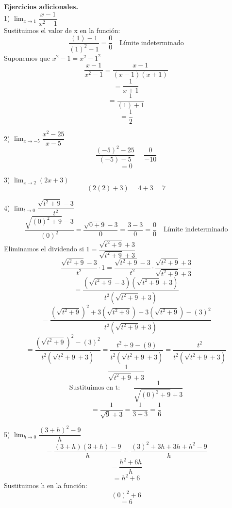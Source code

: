 \documentclass[11pt]{report}
\begin{document}
\pagebreak \textbf{Ejercicios adicionales.}\\[2mm]
1) $\lim_{x \to 1}\dfrac{x-1}{x^2-1}$\\[2mm]
Sustituimos el valor de x en la función:
$$\frac{(1)-1}{(1)^2-1}=\frac{0}{0}\quad \text{Límite indeterminado}$$
Suponemos que $x^2-1=x^2-1^2$
$$\frac{x-1}{x^2-1}=\frac{x-1}{(x-1)(x+1)}$$
$$=\frac{1}{x+1}$$
$$=\frac{1}{(1)+1}$$
$$=\frac{1}{2}$$

2) $\lim_{x \to -5}\dfrac{x^2-25}{x-5}$\\[2mm]
$$\frac{(-5)^2-25}{(-5)-5}=\frac{0}{-10}$$
$$=0$$

3) $\lim_{x \to 2}(2x+3)$\\[2mm]
$$(2(2)+3)=4+3=7$$

4) $\lim_{t \to 0}\dfrac{\sqrt{t^2+9}-3}{t^2}$\\[2mm]
$$\frac{\sqrt{(0)^2+9}-3}{(0)^2}=\frac{\sqrt{0+9}-3}{0}=\frac{3-3}{0}=\frac{0}{0} \quad \text{Límite indeterminado}$$
Eliminamos el dividendo si   $1=\dfrac{\sqrt{t^2+9}+3}{\sqrt{t^2+9}+3}$
$$\dfrac{\sqrt{t^2+9}-3}{t^2}\cdot 1=\dfrac{\sqrt{t^2+9}-3}{t^2} \cdot \dfrac{\sqrt{t^2+9}+3}{\sqrt{t^2+9}+3}$$
$$=\frac{\left(\sqrt{t^2+9}-3\right)\left(\sqrt{t^2+9}+3\right)}{t^2\left(\sqrt{t^2+9}+3\right)}$$
$$=\frac{(\sqrt{t^2+9})^2+3(\sqrt{t^2+9})-3(\sqrt{t^2+9})-(3)^2}{t^2\left(\sqrt{t^2+9}+3\right)}$$
$$=\frac{(\sqrt{t^2+9})^2-(3)^2}{t^2\left(\sqrt{t^2+9}+3\right)}=\frac{t^2+9-(9)}{t^2\left(\sqrt{t^2+9}+3\right)}=\frac{t^2}{t^2\left(\sqrt{t^2+9}+3\right)}$$
$$\frac{1}{\sqrt{t^2+9}+3}$$
$$\text{Sustituimos en t:}\qquad \frac{1}{\sqrt{(0)^2+9}+3}$$
$$=\frac{1}{\sqrt{9}+3}=\frac{1}{3+3}=\frac{1}{6}$$

5) $\lim_{h \to 0}\dfrac{(3+h)^2-9}{h}$\\[2mm]
$$=\frac{(3+h)(3+h)-9}{h}=\frac{(3)^2+3h+3h+h^2-9}{h}$$
$$=\frac{h^2+6h}{h}$$
$$=h^2+6$$
Sustituimos h en la función:\\[2mm]
$$(0)^2+6$$
$$=6$$
\end{document}
